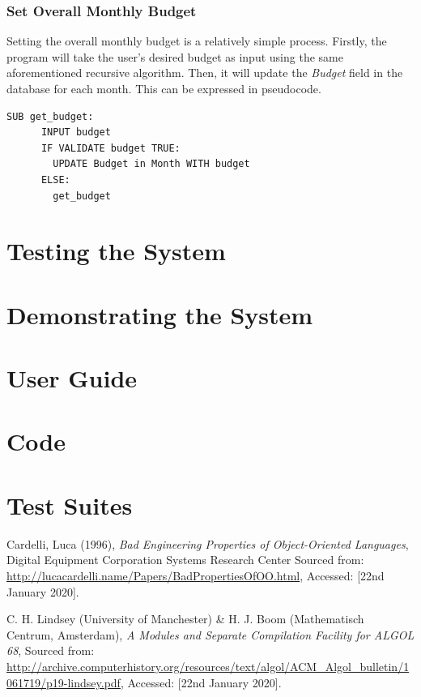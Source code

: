 \documentclass[12pt]{article}
\begin{document}
  \subsubsection{Set Overall Monthly Budget}
  Setting the overall monthly budget is a relatively simple process. Firstly, the program will take the user's desired budget as input using the same aforementioned recursive algorithm. Then, it will update the \textit{Budget} field in the database for each month.
  This can be expressed in pseudocode.
  \begin{lstlisting}[caption=An algorithm to set the overall monthly budget., captionpos=b]
    SUB get_budget:
      INPUT budget
      IF VALIDATE budget TRUE:
        UPDATE Budget in Month WITH budget
      ELSE:
        get_budget
  \end{lstlisting}

  \section{Testing the System}
  \section{Demonstrating the System}

  \appendix
  \section{User Guide}
  \section{Code}
  \section{Test Suites}

  \begin{thebibliography}{9}
    Cardelli, Luca (1996),
    \textit{Bad Engineering Properties of Object-Oriented Languages},
    Digital Equipment Corporation Systems Research Center
    Sourced from: \url{http://lucacardelli.name/Papers/BadPropertiesOfOO.html},
    Accessed: [22nd January 2020].

    C. H. Lindsey (University of Manchester) \&
    H. J. Boom (Mathematisch Centrum, Amsterdam),
    \textit{A Modules and Separate Compilation Facility for ALGOL 68},
    Sourced from: \url{http://archive.computerhistory.org/resources/text/algol/ACM_Algol_bulletin/1061719/p19-lindsey.pdf},
    Accessed: [22nd January 2020].


  \end{thebibliography}
\end{document}
